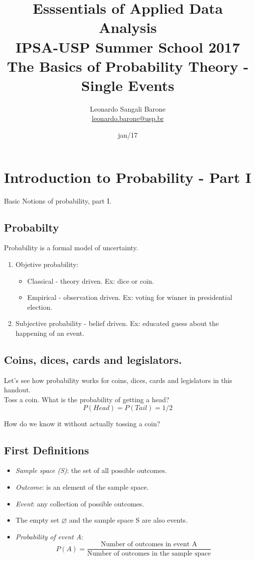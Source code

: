\documentclass[11pt]{article}
\title{\textbf{Esssentials of Applied Data Analysis\\
				IPSA-USP Summer School 2017}\newline\\
				The Basics of Probability Theory - Single Events}
\author{Leonardo Sangali Barone\\ \href{leonardo.barone@usp.br}{leonardo.barone@usp.br}}
\date{jan/17}
\let\emptyset\varnothing
\begin{document}
\maketitle

\section*{Introduction to Probability - Part I}

	Basic Notions of probability, part I.
	
	\subsection*{Probabilty}
	Probability is a formal model of uncertainty.

	\begin{enumerate}
	\item Objetive probability:
		\begin{itemize}
			\item Classical - theory driven. Ex: dice or coin.
			\item Empirical - observation driven. Ex: voting for winner in presidential election.
		\end{itemize}
	\item Subjective probability - belief driven. Ex: educated guess about the happening of an event.
	\end{enumerate}

	\subsection*{Coins, dices, cards and legislators.}
	
	Let's see how probability works for coins, dices, cards and legislators in this handout.\\
	
 	Toss a coin. What is the probability of getting a head?
	\[P(Head) = P(Tail) = 1/2	\]
	
	How do we know it without actually tossing a coin?

	\subsection*{First Definitions}
	\begin{itemize}
		\item \emph{Sample space (S)}: the set of all possible outcomes.
		\item \emph{Outcome}: is an element of the sample space.
		\item \emph{Event}: any collection of possible outcomes.
		\item The empty set $\emptyset$ and the sample space S are also events.	
		\item \emph{Probability of event A}:
			\[P(A) = \frac{\text{Number of outcomes in event A}}
			{\text{Number of outcomes in the sample space}}\]		
	\end {itemize}
\end{document}
